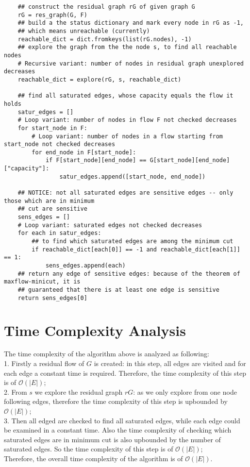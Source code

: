 \documentclass[a4paper,11pt]{article}
\begin{document}
\begin{lstlisting}
    ## construct the residual graph rG of given graph G
    rG = res_graph(G, F)
    ## build a the status dictionary and mark every node in rG as -1,
    ## which means unreachable (currently)
    reachable_dict = dict.fromkeys(list(rG.nodes), -1)
    ## explore the graph from the the node s, to find all reachable nodes
    # Recursive variant: number of nodes in residual graph unexplored decreases
    reachable_dict = explore(rG, s, reachable_dict)

    ## find all saturated edges, whose capacity equals the flow it holds
    satur_edges = []
    # Loop variant: number of nodes in flow F not checked decreases
    for start_node in F:
        # Loop variant: number of nodes in a flow starting from start_node not checked decreases
        for end_node in F[start_node]:
            if F[start_node][end_node] == G[start_node][end_node]["capacity"]:
                satur_edges.append([start_node, end_node])

    ## NOTICE: not all saturated edges are sensitive edges -- only those which are in minimum
    ## cut are sensitive
    sens_edges = []
    # Loop variant: saturated edges not checked decreases
    for each in satur_edges:
        ## to find which saturated edges are among the minimum cut
        if reachable_dict[each[0]] == -1 and reachable_dict[each[1]] == 1:
            sens_edges.append(each)
    ## return any edge of sensitive edges: because of the theorem of maxflow-minicut, it is
    ## guaranteed that there is at least one edge is sensitive
    return sens_edges[0]

\end{lstlisting}

\section{Time Complexity Analysis}
The time complexity of the algorithm above is analyzed as following: \\
1. Firstly a residual flow of $G$ is created: in this step, all edges are visited and for each edge a constant time is required. Therefore, the time complexity of this step is of $\mathcal{O}(|E|)$; \\
2. From $s$ we explore the residual graph $rG$: as we only explore from one node following edges, therefore the time complexity of this step is upbounded by $\mathcal{O}(|E|)$; \\
3. Then all edged are checked to find all saturated edges, while each edge could be examined in a constant time. Also the time complexity of checking which saturated edges are in minimum cut is also upbounded by the number of saturated edges. So the time complexity of this step is of $\mathcal{O}(|E|)$; \\
Therefore, the overall time complexity of the algorithm is of $\mathcal{O}(|E|)$. 
\newpage
\end{document}
